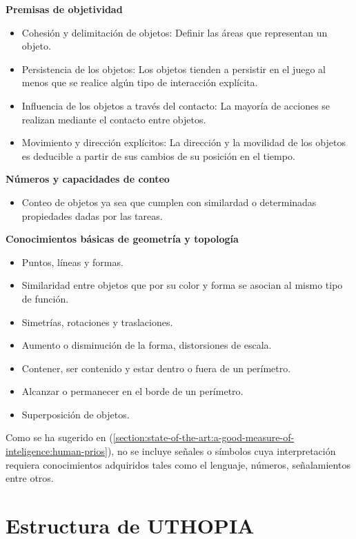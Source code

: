 \textbf{Premisas de objetividad}
\begin{itemize}
\item Cohesión y delimitación de objetos: Definir las áreas que representan un objeto.
\item Persistencia de los objetos: Los objetos tienden a persistir en el juego al menos que se realice algún tipo de interacción explícita.
\item Influencia de los objetos a través del contacto: La mayoría de acciones se realizan mediante el contacto entre objetos.
\item Movimiento y dirección explícitos: La dirección y la movilidad de los objetos es deducible a partir de sus cambios de su posición en el tiempo.
\end{itemize}

\textbf{Números y capacidades de conteo}
\begin{itemize}
    \item Conteo de objetos ya sea que cumplen con similardad o determinadas propiedades dadas por las tareas.
\end{itemize}

\textbf{Conocimientos básicas de geometría y topología}
\begin{itemize}
\item Puntos, líneas y formas.
\item Similaridad entre objetos que por su color y forma se asocian al mismo tipo de función.
\item Simetrías, rotaciones y traslaciones.
\item Aumento o disminución de la forma, distorsiones de escala.
\item Contener, ser contenido y estar dentro o fuera de un perímetro.
\item Alcanzar o permanecer en el borde de un perímetro.
\item Superposición de objetos.
\end{itemize}

Como se ha sugerido en (\ref{section:state-of-the-art:a-good-measure-of-inteligence:human-prios}), no se incluye señales o símbolos cuya interpretación requiera conocimientos adquiridos tales como el lenguaje, números, señalamientos entre otros. 

\section{Estructura de UTHOPIA}


